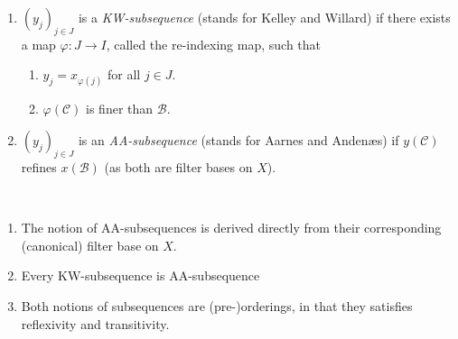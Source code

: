 \documentclass{treatise}
\begin{document}
\begin{enumerate}
    \item $(y_j)_{j \in J}$ is a \emph{KW-subsequence} (stands for Kelley and Willard) if there exists a map $\varphi: J \to I$, called the re-indexing map, such that
    \begin{enumerate}
        \item $y_j = x_{\varphi(j)}$ for all $j \in J$.
        \item $\varphi(\mathcal{C})$ is finer than $\mathcal{B}$.
    \end{enumerate}
    \item $(y_j)_{j \in J}$ is an \emph{AA-subsequence} (stands for Aarnes and Andenæs) if $y(\mathcal{C})$ refines $x(\mathcal{B})$ (as both are filter bases on $X$).
\end{enumerate}
\begin{remark} \ 
\begin{enumerate}
    \item The notion of AA-subsequences is derived directly from their corresponding (canonical) filter base on $X$.
    \item Every KW-subsequence is AA-subsequence
    \item Both notions of subsequences are (pre-)orderings, in that they satisfies reflexivity and transitivity.
\end{enumerate}
\end{remark}
\end{document}

